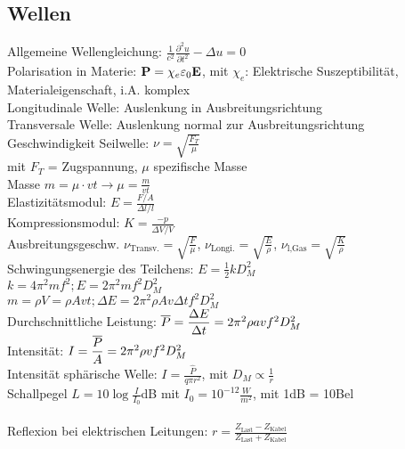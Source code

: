 \documentclass[fs, footer]{latex4ei}
\begin{document}
\begin{multicols*}{4}
\subsection{Wellen}
Allgemeine Wellengleichung: $\frac{1}{c^2}\frac{\partial^2u}{\partial t^2} - \Delta u = 0$\\
Polarisation in Materie: $\textbf{P} = \chi_e\varepsilon_0\textbf{E}$, mit $\chi_e$: Elektrische Suszeptibilität, Materialeigenschaft, i.A. komplex\\
Longitudinale Welle: Auslenkung in Ausbreitungsrichtung\\
Transversale Welle: Auslenkung normal zur Ausbreitungsrichtung\\
Geschwindigkeit Seilwelle: $\nu = \sqrt{\frac{F_T}{\mu}}$\\ mit $F_T$ = Zugspannung, $\mu$ spezifische Masse\\ %
Masse $m = \mu\cdot vt \rightarrow \mu = \frac{m}{vt}$\\
Elastizitätsmodul: $E = \frac{F / A}{\Delta l / l}$\\
Kompressionsmodul: $K = \frac{-p}{\Delta V / V}$\\
Ausbreitungsgeschw. $\nu_{\text{Transv.}} = \sqrt{\frac{F}{\mu}}$, $\nu_{\text{Longi.}} = \sqrt{\frac{E}{\rho}}$, $\nu_\text{l,Gas} = \sqrt{\frac{K}{\rho}}$\\ %
Schwingungsenergie des Teilchens: $E = \frac{1}{2}kD_M^2$\\
$k = 4\pi ^2mf^2; E = 2\pi^2mf^2D_M^2$\\
$m = \rho V = \rho A v t; \Delta E = 2\pi^2 \rho A v \Delta tf^2D_M^2$\\
Durchschnittliche Leistung: $\overline{P} = \dfrac{\Delta E}{\Delta t} = 2\pi ^2 \rho a v f^2 D_M^2$\\
Intensität: $ I = \dfrac{\overline{P}}{A} = 2\pi^2\rho v f^2D_M^2$\\
Intensität sphärische Welle: $I = \frac{\hat{P}}{q\pi r^2}$, mit $D_M \propto \frac{1}{r}$\\
Schallpegel $L = 10\log{\frac{I}{I_0}}$dB mit $I_0 = 10^{-12}\frac{W}{m^2}$, mit 1dB = 10Bel\\
\\
Reflexion bei elektrischen Leitungen: $ r = \frac{Z_{\text{Last}}-Z_{\text{Kabel}}}{Z_{\text{Last}}+Z_{\text{Kabel}}}$


\end{multicols*}
\end{document}
